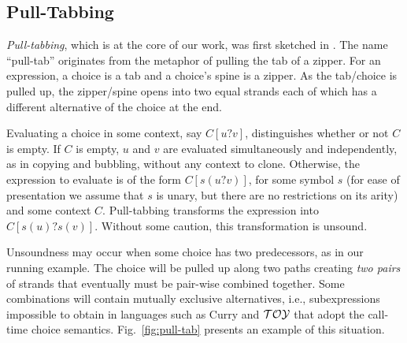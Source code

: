 \documentclass{mytlp}
\newcommand{\TOY}{{\cal TOY}}
\begin{document}
\subsection{Pull-Tabbing}

\emph{Pull-tabbing}, which is at the core of our work, 
was first sketched in \cite{Alqaddoumi10GCM}.
The name ``pull-tab'' originates from the metaphor
of pulling the tab of a zipper.  For an expression,
a choice is a tab and a choice's spine is a zipper.
As the tab/choice is pulled up, the zipper/spine opens
into two equal strands each of which has a different
alternative of the choice at the end.

Evaluating a choice in some context, say $C[u?v]$,
distinguishes whether or not $C$ is empty.
If $C$ is empty, $u$ and $v$ are evaluated
simultaneously and independently, as in copying
and bubbling, without any context to clone.
Otherwise, the expression to evaluate is of the form
$C[s(u?v)]$, for some symbol $s$ (for ease of
presentation we assume that $s$ is unary, but there are no restrictions
on its arity) and some context $C$.
Pull-tabbing transforms the expression into $C[s(u)?s(v)]$.
Without some caution, this transformation is unsound.

Unsoundness may occur when
some choice has two predecessors, as in our running example.
The choice will be pulled up along two paths creating 
\emph{two pairs} of strands
that eventually must be pair-wise combined together.
Some combinations will
contain mutually exclusive alternatives, i.e.,
subexpressions impossible to obtain in
languages such as Curry and $\TOY$ that adopt
the call-time choice semantics.
Fig.~\ref{fig:pull-tab} presents an example of this situation.
\end{document}
